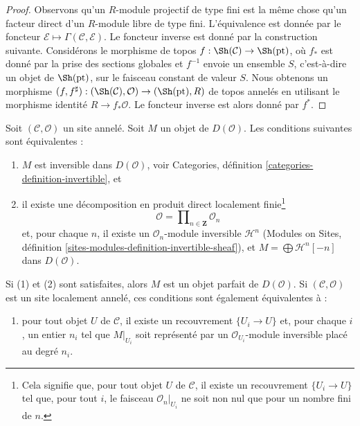 \begin{proof}
Observons qu'un $R$-module projectif de type fini est la même chose qu'un
facteur direct d'un $R$-module libre de type fini. L'équivalence est donnée
par le foncteur
$\mathcal{E} \mapsto \Gamma(\mathcal{C}, \mathcal{E})$. Le foncteur inverse
est donné par la construction suivante. Considérons le morphisme de topos
$f : \Sh(\mathcal{C}) \to \Sh(\text{pt})$, où $f_*$ est donné par la prise
des sections globales et $f^{-1}$ envoie un ensemble $S$, c'est-à-dire un
objet de $\Sh(\text{pt})$, sur le faisceau constant de valeur $S$. Nous
obtenons un morphisme
$(f, f^\sharp) : (\Sh(\mathcal{C}), \mathcal{O}) \to (\Sh(\text{pt}), R)$
de topos annelés en utilisant le morphisme identité $R \to f_*\mathcal{O}$.
Le foncteur inverse est alors donné par $f^*$.
\end{proof}

\begin{lemma}
\label{lemma-invertible-derived}
Soit $(\mathcal{C}, \mathcal{O})$ un site annelé. Soit $M$ un objet de
$D(\mathcal{O})$. Les conditions suivantes sont équivalentes :
\begin{enumerate}
\item $M$ est inversible dans $D(\mathcal{O})$, voir Categories, définition
\ref{categories-definition-invertible}, et
\item il existe une décomposition en produit direct localement
finie\footnote{Cela signifie que, pour tout objet $U$ de $\mathcal{C}$, il
existe un recouvrement $\{U_i \to U\}$ tel que, pour tout $i$, le faisceau
$\mathcal{O}_n|_{U_i}$ ne soit non nul que pour un nombre fini de $n$.}
$$
\mathcal{O} = \prod\nolimits_{n \in \mathbf{Z}} \mathcal{O}_n
$$
et, pour chaque $n$, il existe un $\mathcal{O}_n$-module inversible
$\mathcal{H}^n$ (Modules on Sites, définition
\ref{sites-modules-definition-invertible-sheaf}), et
$M = \bigoplus \mathcal{H}^n[-n]$ dans $D(\mathcal{O})$.
\end{enumerate}
Si (1) et (2) sont satisfaites, alors $M$ est un objet parfait de
$D(\mathcal{O})$. Si $(\mathcal{C}, \mathcal{O})$ est un site localement
annelé, ces conditions sont également équivalentes à :
\begin{enumerate}
\item[(3)] pour tout objet $U$ de $\mathcal{C}$, il existe un recouvrement
$\{U_i \to U\}$ et, pour chaque $i$, un entier $n_i$ tel que $M|_{U_i}$ soit
représenté par un $\mathcal{O}_{U_i}$-module inversible placé au degré $n_i$.
\end{enumerate}
\end{lemma}

